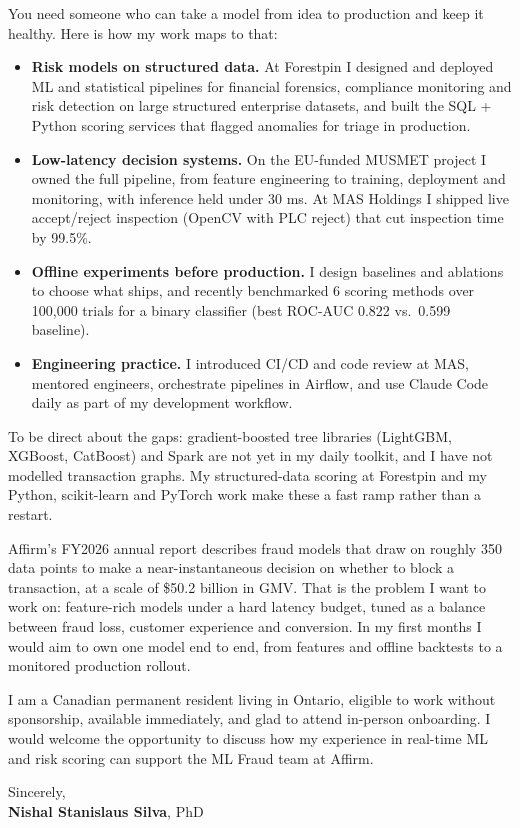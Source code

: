 \documentclass[11pt]{article}
\newcommand{\clName}{Nishal Stanislaus Silva}
\newcommand{\clCompany}{Affirm}
\newcommand{\clTeam}{the ML Fraud team}
\begin{document}
You need someone who can take a model from idea to production and keep it healthy. Here is how my work maps to that:
\begin{itemize}[leftmargin=1.4em, itemsep=0.1em, topsep=0.2em]
    \item \textbf{Risk models on structured data.} At Forestpin I designed and deployed ML and statistical pipelines for financial forensics, compliance monitoring and risk detection on large structured enterprise datasets, and built the SQL + Python scoring services that flagged anomalies for triage in production.
    \item \textbf{Low-latency decision systems.} On the EU-funded MUSMET project I owned the full pipeline, from feature engineering to training, deployment and monitoring, with inference held under 30 ms. At MAS Holdings I shipped live accept/reject inspection (OpenCV with PLC reject) that cut inspection time by 99.5\%.
    \item \textbf{Offline experiments before production.} I design baselines and ablations to choose what ships, and recently benchmarked 6 scoring methods over 100,000 trials for a binary classifier (best ROC-AUC 0.822 vs.\ 0.599 baseline).
    \item \textbf{Engineering practice.} I introduced CI/CD and code review at MAS, mentored engineers, orchestrate pipelines in Airflow, and use Claude Code daily as part of my development workflow.
\end{itemize}
To be direct about the gaps: gradient-boosted tree libraries (LightGBM, XGBoost, CatBoost) and Spark are not yet in my daily toolkit, and I have not modelled transaction graphs. My structured-data scoring at Forestpin and my Python, scikit-learn and PyTorch work make these a fast ramp rather than a restart.

Affirm's FY2026 annual report describes fraud models that draw on roughly 350 data points to make a near-instantaneous decision on whether to block a transaction, at a scale of \$50.2 billion in GMV. That is the problem I want to work on: feature-rich models under a hard latency budget, tuned as a balance between fraud loss, customer experience and conversion. In my first months I would aim to own one model end to end, from features and offline backtests to a monitored production rollout.

I am a Canadian permanent resident living in Ontario, eligible to work without sponsorship, available immediately, and glad to attend in-person onboarding. I would welcome the opportunity to discuss how my experience in real-time ML and risk scoring can support \clTeam{} at \clCompany{}.

\vspace{8pt}
Sincerely,\\[2pt]
\textbf{\clName}, PhD
\end{document}
